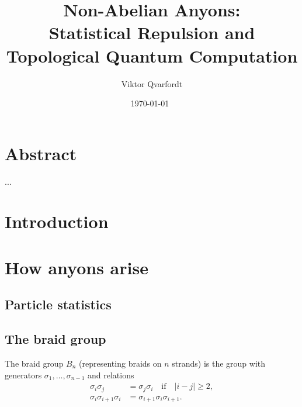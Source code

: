 \documentclass[a4paper,10pt,oneside]{book}
\theoremstyle{plain}
\theoremstyle{definition}
\theoremstyle{remark}
\begin{document}
\title{Non-Abelian Anyons:\\Statistical Repulsion and\\Topological Quantum Computation}
\author{Viktor Qvarfordt}
\date{\isodate\today\ \currenttime}


\maketitle

\chapter*{Abstract}

...

\tableofcontents

\newpage






















\chapter{Introduction}

\chapter{How anyons arise}\label{chap:how anyons arise}


\section{Particle statistics}

\section{The braid group}\label{sec:braid group}

The braid group $B_n$ (representing braids on $n$ strands) is the group with generators $σ_1, \ldots, σ_{n-1}$ and relations
\begin{subequations}
\label{eq:braid relations}
  \begin{align}
    \label{eq:braid relation 1}
    σ_i σ_j &= σ_j σ_i \quad\text{if}\quad |i-j| \ge 2, \\
    \label{eq:braid relation 2}
    σ_i σ_{i+1} σ_i &= σ_{i+1} σ_i σ_{i+1}.
  \end{align}
\end{subequations}
\end{document}
